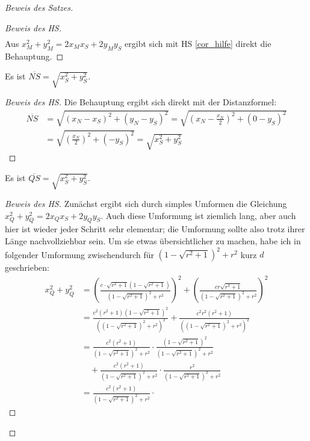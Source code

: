 \begin{proof}[Beweis des Satzes]
\begin{proof}[Beweis des HS]
\begin{align*}
        \end{align*}
        Aus $x_M^2+y_M^2=2x_Mx_S+2y_My_S$ ergibt sich mit HS \ref{cor_hilfe} direkt die Behauptung.
    \end{proof}
    \begin{lem}\label{dumm_N}
        Es ist $\overline{NS}=\sqrt{x_S^2+y_S^2}$.
    \end{lem}
    \begin{proof}[Beweis des HS]
        Die Behauptung ergibt sich direkt mit der Distanzformel:
        \begin{align*}
            \overline{NS}&=\sqrt{(x_N-x_S)^2+(y_N-y_S)^2}=\sqrt{\left(x_N-\frac{x_N}{2}\right)^2+(0-y_S)^2}\\
            &=\sqrt{\left(\frac{x_N}{2}\right)^2+(-y_S)^2}=\sqrt{x_S^2+y_S^2}
        \end{align*}
    \end{proof}
    \begin{lem}\label{dumm_Q}
        Es ist $\overline{QS}=\sqrt{x_S^2+y_S^2}$.
    \end{lem}
    \begin{proof}[Beweis des HS]
        Zunächst ergibt sich durch simples Umformen die Gleichung $x_Q^2+y_Q^2=2x_Qx_S+2y_Qy_S$. Auch diese 
        Umformung ist ziemlich lang, aber auch hier ist wieder jeder Schritt sehr elementar; die Umformung sollte 
        also trotz ihrer Länge nachvollziehbar sein. Um sie etwas übersichtlicher zu machen, habe ich in folgender 
        Umformung zwischendurch für $\left(1-\sqrt{r^2+1}\right)^2+r^2$ kurz $d$ geschrieben:
        \begin{align*}
            x_Q^2+y_Q^2&= \left(\frac{c\cdot\sqrt{r^2+1}\left(1-\sqrt{r^2+1}\right)}
            {\left(1-\sqrt{r^2+1}\right)^2+r^2}\right)^2+\left(\frac{cr\sqrt{r^2+1}}{\left(1-\sqrt{r^2+1}\right)^2
            +r^2}\right)^2\\
            &=\frac{c^2(r^2+1)\left(1-\sqrt{r^2+1}\right)^2}{\left(\left(1-\sqrt{r^2+1}\right)^2+r^2\right)^2}+
            \frac{c^2r^2(r^2+1)}{\left(\left(1-\sqrt{r^2+1}\right)^2+r^2\right)^2}\\
            &=\frac{c^2(r^2+1)}{\left(1-\sqrt{r^2+1}\right)^2+r^2}\cdot\frac{\left(1-\sqrt{r^2+1}\right)^2}
            {\left(1-\sqrt{r^2+1}\right)^2+r^2}\\
            &\quad+\frac{c^2(r^2+1)}{\left(1-\sqrt{r^2+1}\right)^2+r^2}\cdot
            \frac{r^2}{\left(1-\sqrt{r^2+1}\right)^2+r^2}\\
            &=\frac{c^2(r^2+1)}{\left(1-\sqrt{r^2+1}\right)^2+r^2}\cdot

\end{align*}
\end{proof}
\end{proof}
